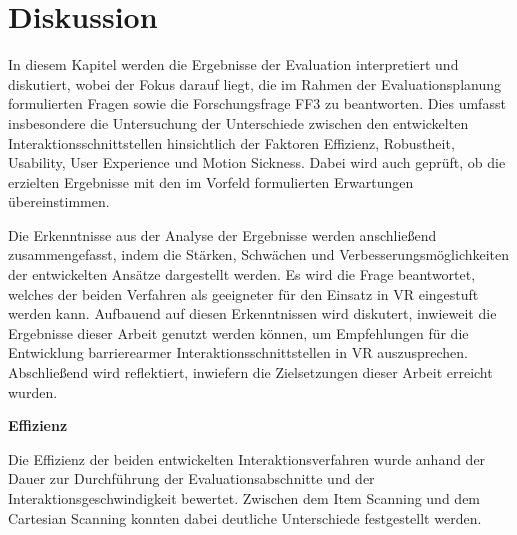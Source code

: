 \chapter{Diskussion}
\label{chap:Diskussion}

In diesem Kapitel werden die Ergebnisse der Evaluation interpretiert und diskutiert, wobei der Fokus darauf liegt, die im Rahmen der Evaluationsplanung formulierten Fragen sowie die Forschungsfrage FF3 zu beantworten. Dies umfasst insbesondere die Untersuchung der Unterschiede zwischen den entwickelten Interaktionsschnittstellen hinsichtlich der Faktoren Effizienz, Robustheit, Usability, User Experience und Motion Sickness. Dabei wird auch geprüft, ob die erzielten Ergebnisse mit den im Vorfeld formulierten Erwartungen übereinstimmen.

Die Erkenntnisse aus der Analyse der Ergebnisse werden anschließend zusammengefasst, indem die Stärken, Schwächen und Verbesserungsmöglichkeiten der entwickelten Ansätze dargestellt werden. Es wird die Frage beantwortet, welches der beiden Verfahren als geeigneter für den Einsatz in VR eingestuft werden kann. Aufbauend auf diesen Erkenntnissen wird diskutert, inwieweit die Ergebnisse dieser Arbeit genutzt werden können, um Empfehlungen für die Entwicklung barrierearmer Interaktionsschnittstellen in VR auszusprechen.
Abschließend wird reflektiert, inwiefern die Zielsetzungen dieser Arbeit erreicht wurden.

\textbf{Effizienz}

Die Effizienz der beiden entwickelten Interaktionsverfahren wurde anhand der Dauer zur Durchführung der Evaluationsabschnitte und der Interaktionsgeschwindigkeit bewertet. Zwischen dem Item Scanning und dem Cartesian Scanning konnten dabei deutliche Unterschiede festgestellt werden.


